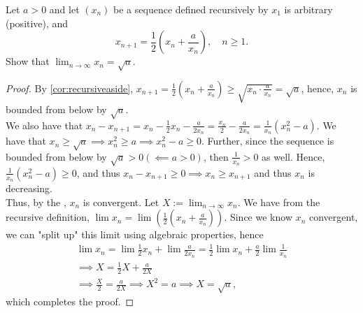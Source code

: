 \documentclass[12pt]{article}
\begin{document}
\begin{example}[$\textcolor{red}{\star}$]
  Let $a> 0$ and let $(x_n)$ be a sequence defined recursively by $x_1$ is arbitrary (positive), and \[x_{n+1} = \frac{1}{2}(x_n + \frac{a}{x_n}), \quad n \geq 1.\] Show that $\lim_{n\to\infty}x_n = \sqrt{a}$.

  \begin{proof}
    By \cref{cor:recursiveaside}, $x_{n+1} = \frac{1}{2}(x_n + \frac{a}{x_n}) \geq \sqrt{x_n \cdot \frac{a}{x_n}} = \sqrt{a}$, hence, $x_n$ is bounded from below by $\sqrt{a}$.\\
    We also have that $x_n - x_{n+1} = x_n - \frac{1}{2}x_{n} - \frac{a}{2x_n} = \frac{x_n}{2} - \frac{a}{2x_n} = \frac{1}{x_n}\left(x_n^2 - a\right)$. We have that $x_n \geq \sqrt{a} \implies x_{n}^2 \geq a \implies x_{n}^2 -a \geq 0$. Further, since the sequence is bounded from below by $\sqrt{a} > 0 (\impliedby a > 0)$, then $\frac{1}{x_{n}} > 0$ as well. Hence, $\frac{1}{x_n}(x_n^2 - a) \geq 0$, and thus $x_{n} - x_{n+1} \geq 0 \implies x_n \geq x_{n+1}$ and thus $x_{n}$ is decreasing.\\
    Thus, by the , $x_n$ is convergent. Let $X:= \lim_{n\to\infty}x_n$. We have from the recursive definition, $\lim x_{n} = \lim \left(\frac{1}{2}(x_n + \frac{a}{x_n})\right)$. Since we know $x_{n}$ convergent, we can "split up" this limit using algebraic properties, hence\begin{align*}
      \lim x_n= \lim \frac{1}{2} x_n + \lim \frac{a}{2x_n} = \frac{1}{2}\lim x_n + \frac{a}{2} \lim \frac{1}{x_n}\\
      \implies X = \frac{1}{2}X + \frac{a}{2X}\\
      \implies \frac{X}{2} = \frac{a}{2X} \implies X^2 = a \implies X = \sqrt{a},
    \end{align*}
    which completes the proof.
  \end{proof}
\end{example}
\end{document}
